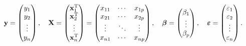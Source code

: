 \begin{equation}
   \mathbf{y} = \begin{pmatrix} y_1 \\ y_2 \\ \vdots \\ y_n \end{pmatrix}, \quad
   \mathbf{X} = \begin{pmatrix} \mathbf{x}^{\rm T}_1 \\ \mathbf{x}^{\rm T}_2 \\ \vdots \\ \mathbf{x}^{\rm T}_n \end{pmatrix}
   = \begin{pmatrix} x_{11} & \cdots & x_{1p} \\
   x_{21} & \cdots & x_{2p} \\
   \vdots & \ddots & \vdots \\
   x_{n1} & \cdots & x_{np}
   \end{pmatrix}, \quad
   \boldsymbol\beta = \begin{pmatrix} \beta_1 \\ \vdots \\ \beta_p \end{pmatrix}, \quad
   \boldsymbol\varepsilon = \begin{pmatrix} \varepsilon_1 \\ \varepsilon_2 \\ \vdots \\ \varepsilon_n \end{pmatrix}.
\end{equation}


